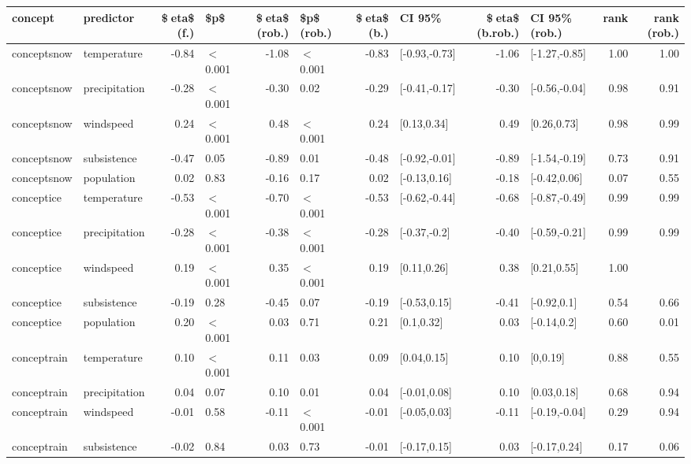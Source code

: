 \begin{table}[ht]
\centering
\begin{tabular}{llrlrlrlrlrr}
  \hline
concept & predictor & \$eta\$ (f.) & \$p\$ & \$eta\$ (rob.) & \$p\$ (rob.) & \$eta\$ (b.) & CI 95\% & \$eta\$ (b.rob.) & CI 95\% (rob.) & rank & rank (rob.) \\ 
  \hline
conceptsnow & temperature & -0.84 & $<$ 0.001 & -1.08 & $<$ 0.001 & -0.83 & [-0.93,-0.73] & -1.06 & [-1.27,-0.85] & 1.00 & 1.00 \\ 
  conceptsnow & precipitation & -0.28 & $<$ 0.001 & -0.30 & 0.02 & -0.29 & [-0.41,-0.17] & -0.30 & [-0.56,-0.04] & 0.98 & 0.91 \\ 
  conceptsnow & windspeed & 0.24 & $<$ 0.001 & 0.48 & $<$ 0.001 & 0.24 & [0.13,0.34] & 0.49 & [0.26,0.73] & 0.98 & 0.99 \\ 
  conceptsnow & subsistence & -0.47 & 0.05 & -0.89 & 0.01 & -0.48 & [-0.92,-0.01] & -0.89 & [-1.54,-0.19] & 0.73 & 0.91 \\ 
  conceptsnow & population & 0.02 & 0.83 & -0.16 & 0.17 & 0.02 & [-0.13,0.16] & -0.18 & [-0.42,0.06] & 0.07 & 0.55 \\ 
  conceptice & temperature & -0.53 & $<$ 0.001 & -0.70 & $<$ 0.001 & -0.53 & [-0.62,-0.44] & -0.68 & [-0.87,-0.49] & 0.99 & 0.99 \\ 
  conceptice & precipitation & -0.28 & $<$ 0.001 & -0.38 & $<$ 0.001 & -0.28 & [-0.37,-0.2] & -0.40 & [-0.59,-0.21] & 0.99 & 0.99 \\ 
  conceptice & windspeed & 0.19 & $<$ 0.001 & 0.35 & $<$ 0.001 & 0.19 & [0.11,0.26] & 0.38 & [0.21,0.55] & 1.00 &  \\ 
  conceptice & subsistence & -0.19 & 0.28 & -0.45 & 0.07 & -0.19 & [-0.53,0.15] & -0.41 & [-0.92,0.1] & 0.54 & 0.66 \\ 
  conceptice & population & 0.20 & $<$ 0.001 & 0.03 & 0.71 & 0.21 & [0.1,0.32] & 0.03 & [-0.14,0.2] & 0.60 & 0.01 \\ 
  conceptrain & temperature & 0.10 & $<$ 0.001 & 0.11 & 0.03 & 0.09 & [0.04,0.15] & 0.10 & [0,0.19] & 0.88 & 0.55 \\ 
  conceptrain & precipitation & 0.04 & 0.07 & 0.10 & 0.01 & 0.04 & [-0.01,0.08] & 0.10 & [0.03,0.18] & 0.68 & 0.94 \\ 
  conceptrain & windspeed & -0.01 & 0.58 & -0.11 & $<$ 0.001 & -0.01 & [-0.05,0.03] & -0.11 & [-0.19,-0.04] & 0.29 & 0.94 \\ 
  conceptrain & subsistence & -0.02 & 0.84 & 0.03 & 0.73 & -0.01 & [-0.17,0.15] & 0.03 & [-0.17,0.24] & 0.17 & 0.06 \\ 

\end{tabular}
\end{table}
